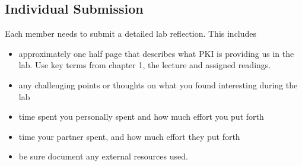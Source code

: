 \documentclass{article}
\begin{document}
\subsection{Individual Submission}
Each member needs to submit a detailed lab reflection. This includes 
\begin{itemize}
\item approximately one half page that describes what PKI is providing us in the lab.  Use key terms from chapter 1, the lecture and assigned readings. 
\item any challenging points or thoughts on what you found interesting during the lab 
\item time spent you personally spent and how much effort you put forth
\item time your partner spent, and how much effort they put forth
\item be sure document any external resources used. 
\end{itemize}
\end{document}
